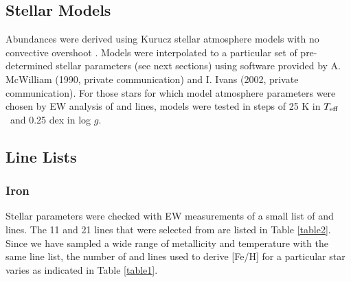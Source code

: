 \documentclass[12pt,preprint]{aastex}
\def\teff{\mbox{$T_{\rm {eff}}$}}
\begin{document}
\subsection{Stellar Models}
Abundances were derived using Kurucz stellar atmosphere models with no convective overshoot \citep{Castelli1997}.  Models were interpolated to a particular set of pre-determined stellar parameters (see next sections) using software provided by A. McWilliam (1990, private communication) and I. Ivans (2002, private communication).  For those stars for which model atmosphere parameters were chosen by EW analysis of  and  lines, models were tested in steps of 25 K in \teff~and  0.25 dex in log $g$.

\subsection{Line Lists}
\subsubsection{Iron \label{iron}}Stellar parameters were checked with EW measurements of a small list of  and  lines.  The 11  and  21  lines that were selected from \citet{Grevesse1999} are listed in Table \ref{table2}.  Since we have sampled a wide range of metallicity and temperature with the same line list, the number of  and  lines used to derive [Fe/H] for a particular star varies as indicated in Table \ref{table1}.  
\end{document}
